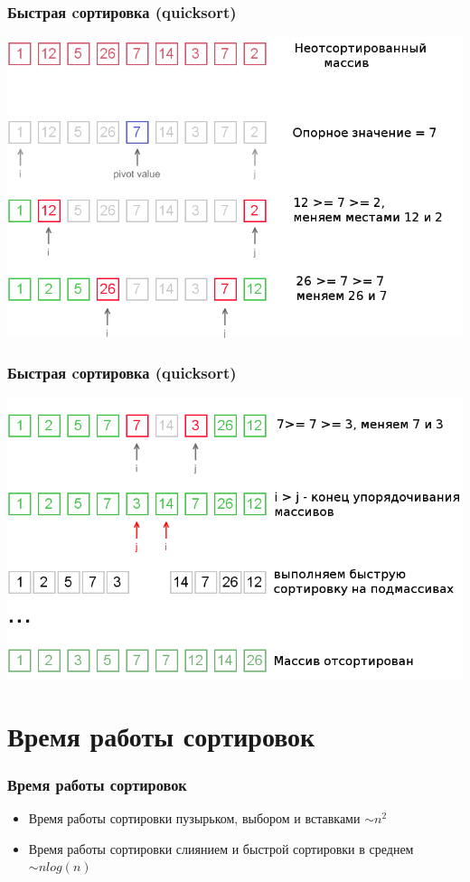 \documentclass[12pt,pdf,hyperref={unicode}]{beamer}
\begin{document}
\begin{frame}[fragile]
\frametitle{Быстрая cортировка (quicksort)} 
\begin{center}
\includegraphics[width=0.9\linewidth]{images/qs1.png}
\end{center}
\end{frame}

\begin{frame}[fragile]
\frametitle{Быстрая cортировка (quicksort)} 
\begin{center}
\includegraphics[width=0.9\linewidth]{images/qs2.png}
\end{center}
\end{frame}


\section{Время работы сортировок}

\begin{frame}[fragile]
\frametitle{Время работы сортировок} 
\begin{itemize}
\item Время работы сортировки пузырьком, выбором и вставками $\sim n^2$ \\
\item Время работы сортировки слиянием и быстрой сортировки в среднем $\sim n log(n)$ \\
\end{itemize}
\end{frame}
\end{document}
